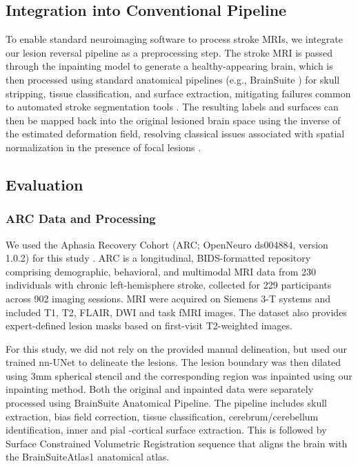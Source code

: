 \documentclass[runningheads]{llncs}
\begin{document}
\subsection{Integration into Conventional Pipeline}
To enable standard neuroimaging software to process stroke MRIs, we integrate our lesion reversal pipeline as a preprocessing step. The stroke MRI is passed through the inpainting model to generate a healthy-appearing brain, which is then processed using standard anatomical pipelines (e.g., BrainSuite \cite{Shattuck2002}) for skull stripping, tissue classification, and surface extraction, mitigating failures common to automated stroke segmentation tools \cite{Pustina2016}. The resulting labels and surfaces can then be mapped back into the original lesioned brain space using the inverse of the estimated deformation field, resolving classical issues associated with spatial normalization in the presence of focal lesions \cite{Brett2001}.

\subsection{Evaluation}

\subsubsection{ARC Data and Processing}
We used the Aphasia Recovery Cohort (ARC; OpenNeuro ds004884, version 1.0.2) for this study \cite{gibson2024aphasia}. ARC is a longitudinal, BIDS-formatted repository comprising demographic, behavioral, and multimodal MRI data from 230 individuals with chronic left-hemisphere stroke, collected for 229 participants across 902 imaging sessions. MRI were acquired on Siemens 3-T systems and included T1, T2, FLAIR, DWI and task fMRI images. The dataset also provides expert-defined lesion masks based on first-visit T2-weighted images. 

For this study, we did not rely on the provided manual delineation, but used our trained nn-UNet to delineate the lesions. The lesion boundary was then dilated using 3mm spherical stencil and the corresponding region was inpainted using our inpainting method.
Both the original and inpainted data were separately processed using BrainSuite Anatomical Pipeline. The pipeline includes skull extraction, bias field correction, tissue classification, cerebrum/cerebellum identification, inner and pial -cortical surface extraction. This is followed by Surface Constrained Volumetric Registration sequence that aligns the brain with the BrainSuiteAtlas1 anatomical atlas. 
\end{document}

